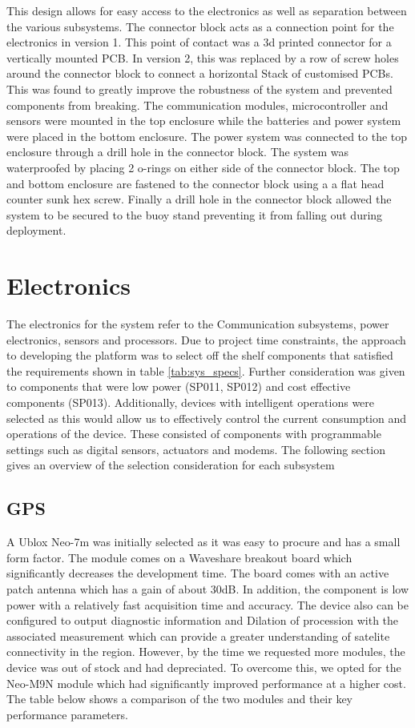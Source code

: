 This design allows for easy access to the electronics as well as separation between the various subsystems. The connector block acts as a connection point for the electronics in version 1. This point of contact was a 3d printed connector for a vertically mounted PCB. In version 2, this was replaced by a row of screw holes around the connector block to connect a horizontal Stack of customised PCBs. This was found to greatly improve the robustness of the system and prevented components from breaking. The communication modules, microcontroller and sensors were mounted in the top enclosure while the batteries and power system were placed in the bottom enclosure. The power system was connected to the top enclosure through a drill hole in the connector block. The system was waterproofed by placing 2 o-rings on either side of the connector block. The top and bottom enclosure are fastened to the connector block using a a flat head counter sunk hex screw. Finally a drill hole in the connector block allowed the system to be secured to the buoy stand preventing it from falling out during deployment.

\section{Electronics}

The electronics for the system refer to the Communication subsystems, power electronics, sensors and processors. Due to project time constraints, the approach to developing the platform was to select off the shelf components that satisfied the requirements shown in table \ref{tab:sys_specs}. Further consideration was given to components that were low power (SP011, SP012) and cost effective components (SP013). Additionally, devices with intelligent operations were selected as this would allow us to effectively control the current consumption and operations of the device. These consisted of components with programmable settings such as digital sensors, actuators and modems. The following section gives an overview of the selection consideration for each subsystem

\subsection{GPS}

A Ublox Neo-7m was initially selected as it was easy to procure and has a small form factor. The module comes on a Waveshare breakout board which significantly decreases the development time. The board comes with an active patch antenna which has a gain of about 30dB. In addition, the component is low power with a relatively fast acquisition time and accuracy. The device also can be configured to output diagnostic information and Dilation of procession with the associated measurement which can provide a greater understanding of satelite connectivity in the region. However, by the time we requested more modules, the device was out of stock and had depreciated. To overcome this, we opted for the Neo-M9N module which had significantly improved performance at a higher cost. The table below shows a comparison of the two modules and their key performance parameters.

